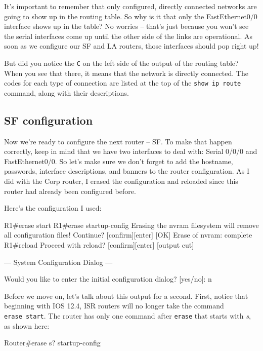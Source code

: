 It's important to remember that only configured, directly connected
networks are going to show up in the routing table. So why is it that
only the FastEthernet0/0 interface shows up in the table? No
worries -- that's just because you won't see the serial interfaces come
up until the other side of the links are operational. As soon as we
configure our SF and LA routers, those interfaces should pop right up!

But did you notice the \texttt{C} on the left side of the output of the
routing table? When you see that there, it means that the network is
directly connected. The codes for each type of connection are listed at
the top of the \texttt{show\ ip\ route} command, along with their
descriptions.

\subsection{SF configuration}

Now we're ready to configure the next router -- SF. To make that happen
correctly, keep in mind that we have two interfaces to deal with: Serial
0/0/0 and FastEthernet0/0. So let's make sure we don't forget to add
the hostname, passwords, interface descriptions, and banners to the
router configuration. As I did with the Corp router, I erased the
configuration and reloaded since this router had already been configured
before.

Here's the configuration I used:

\begin{cli}
R1#erase start
R1#erase startup-config
Erasing the nvram filesystem will remove all configuration files!
   Continue? [confirm][enter]
[OK]
Erase of nvram: complete
R1#reload
Proceed with reload? [confirm][enter]
[output cut]
 
         --- System Configuration Dialog ---
 
Would you like to enter the initial configuration dialog? [yes/no]: n
\end{cli}

Before we move on, let's talk about this output for a second. First,
notice that beginning with IOS 12.4, ISR routers will no longer take the
command \texttt{erase\ start}. The router has only one command after
\texttt{erase} that starts with \emph{s}, as shown here:

\begin{cli}
Router#erase s?
startup-config
\end{cli}

